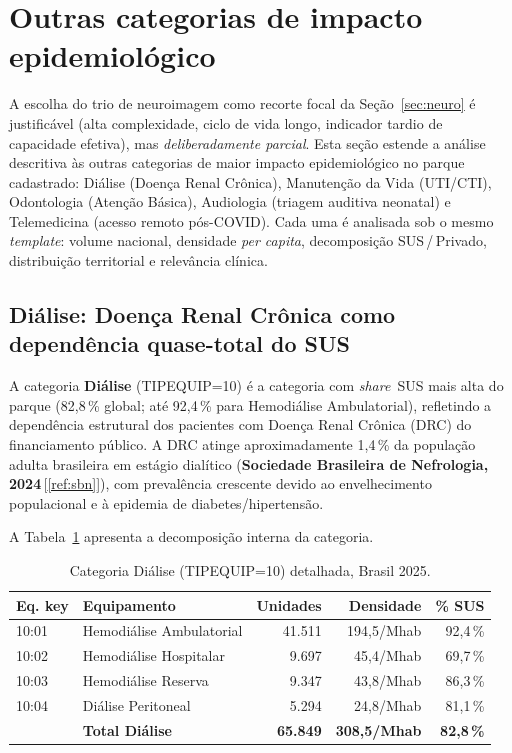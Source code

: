 \documentclass[12pt,a4paper,oneside]{article}
\begin{document}
\section{Outras categorias de impacto epidemiológico}\label{sec:outras}

A escolha do trio de neuroimagem como recorte focal da
Seção~\ref{sec:neuro} é justificável (alta complexidade, ciclo de
vida longo, indicador tardio de capacidade efetiva), mas
\textit{deliberadamente parcial}. Esta seção estende a análise
descritiva às outras categorias de maior impacto epidemiológico no
parque cadastrado: Diálise (Doença Renal Crônica), Manutenção
da Vida (UTI/CTI), Odontologia (Atenção Básica), Audiologia
(triagem auditiva neonatal) e Telemedicina (acesso remoto
pós-COVID). Cada uma é analisada sob o mesmo \textit{template}:
volume nacional, densidade \textit{per capita}, decomposição
SUS\,/\,Privado, distribuição territorial e relevância clínica.

\subsection{Diálise: Doença Renal Crônica como dependência
quase-total do SUS}\label{sub:dialise}

A categoria \textbf{Diálise} (TIPEQUIP=10) é a categoria com
\textit{share}~SUS mais alta do parque (82,8\,\% global; até
92,4\,\% para Hemodiálise Ambulatorial), refletindo a dependência
estrutural dos pacientes com Doença Renal Crônica (DRC) do
financiamento público. A DRC atinge aproximadamente 1,4\,\% da
população adulta brasileira em estágio dialítico
(\textbf{Sociedade Brasileira de Nefrologia, 2024}\,[\ref{ref:sbn}]),
com prevalência crescente devido ao envelhecimento populacional e à
epidemia de diabetes/hipertensão.

A Tabela~\ref{tab:dialise-detalhe} apresenta a decomposição interna
da categoria.

\begin{table}[htbp]
\centering
\caption{Categoria Diálise (TIPEQUIP=10) detalhada, Brasil 2025.}
\label{tab:dialise-detalhe}
\small
\begin{tabular}{l l r r r}
\toprule
\textbf{Eq. key} & \textbf{Equipamento} & \textbf{Unidades} &
\textbf{Densidade} & \textbf{\% SUS} \\
\midrule
10{:}01 & Hemodiálise Ambulatorial   & 41.511 & 194,5/Mhab & 92,4\,\% \\
10{:}02 & Hemodiálise Hospitalar     &  9.697 &  45,4/Mhab & 69,7\,\% \\
10{:}03 & Hemodiálise Reserva        &  9.347 &  43,8/Mhab & 86,3\,\% \\
10{:}04 & Diálise Peritoneal         &  5.294 &  24,8/Mhab & 81,1\,\% \\
\midrule
        & \textbf{Total Diálise}     & \textbf{65.849} & \textbf{308,5/Mhab} & \textbf{82,8\,\%} \\
\bottomrule
\end{tabular}
\end{table}
\end{document}

